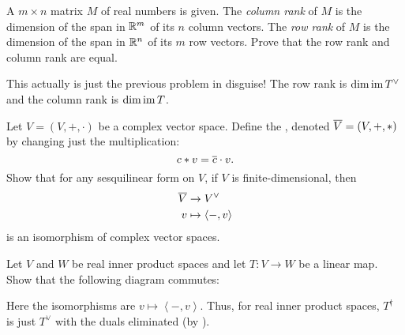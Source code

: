 \begin{dproblem}
	A $m \times n$ matrix $M$ of real numbers is given.
	The \emph{column rank} of $M$ is the dimension of the span in $\mathbb R^m$
	of its $n$ column vectors.
	The \emph{row rank} of $M$ is the dimension of the span in $\mathbb R^n$
	of its $m$ row vectors.
	Prove that the row rank and column rank are equal.
	\begin{hint}
		This actually is just the previous problem in disguise!
		The row rank is $\dim \operatorname{im} T^\vee$
		and the column rank is $\dim \operatorname{im} T$.
	\end{hint}
\end{dproblem}

\begin{problem}
	\label{prob:complex_conj_space}
	Let $V = (V, +, \cdot)$ be a complex vector space.
	Define the ,
	denoted $\overline V = (V, +, \ast)$
	by changing just the multiplication:
	\[ c \ast v = \overline c \cdot v. \]
	Show that for any sesquilinear form on $V$,
	if $V$ is finite-dimensional, then
	\begin{align*}
		\overline V & \to V^\vee \\
		v &\mapsto \left< -, v \right>
	\end{align*}
	is an isomorphism of complex vector spaces.
\end{problem}

\begin{problem}
	Let $V$ and $W$ be real inner product spaces
	and let $T \colon V \to W$ be a linear map.
	Show that the following diagram commutes:
	\begin{center}
	\end{center}
	Here the isomorphisms are $v \mapsto \left< -, v\right>$.
	Thus, for real inner product spaces,
	$T^\dagger$ is just $T^\vee$ with the duals eliminated
	(by ).
\end{problem}

